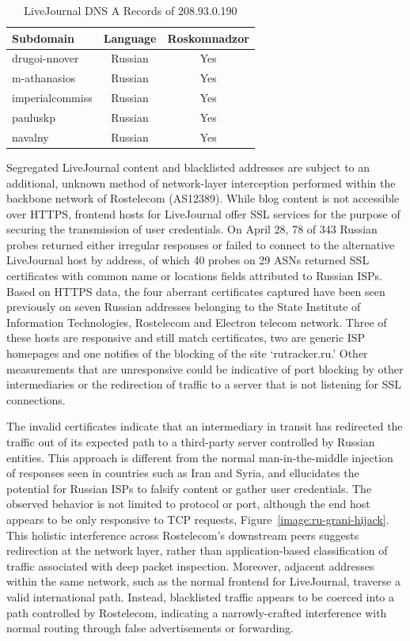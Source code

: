 \begin{table}
    \begin{tabular}{l | c | c}
        \textbf{Subdomain} & \textbf{Language} & \textbf{Roskomnadzor}\\
        \hline
        drugoi-nnover & Russian & Yes\\
        m-athanasios & Russian & Yes\\
        imperialcommiss & Russian & Yes\\
        pauluskp & Russian & Yes \\
        navalny & Russian & Yes \\
        \hline
    \end{tabular}
    \caption{LiveJournal DNS A Records of 208.93.0.190}
    \label{table:lj-blocked-blogs}
\end{table}

Segregated LiveJournal content and blacklisted addresses are subject to an
additional, unknown method of network-layer interception performed within the
backbone network of Rostelecom (AS12389). While blog content is not
accessible over HTTPS, frontend hosts for LiveJournal offer SSL services for the purpose of
securing the transmission of user credentials. On April 28, 78 of 343 Russian
probes returned either irregular responses or failed to connect to the alternative LiveJournal host by address, of which 40
probes on 29 ASNs returned SSL certificates with common name or locations
fields attributed to Russian ISPs. Based on HTTPS data, the four aberrant
certificates captured have been seen previously on seven Russian addresses
belonging to the State Institute of Information Technologies, Rostelecom and
Electron telecom network. Three of these hosts are responsive and still match
certificates, two are generic ISP homepages and one notifies of the blocking of
the site `rutracker.ru.' Other measurements that are unresponsive could be
indicative of port blocking by other intermediaries or the redirection of
traffic to a server that is not listening for SSL connections.

The invalid certificates indicate that an intermediary in transit has
redirected the traffic out of its expected path to a third-party
server controlled by Russian entities. This approach is different from the
normal man-in-the-middle injection of responses seen in countries such as Iran and Syria, and
ellucidates the potential for Russian ISPs to falsify content or gather user
credentials. The observed behavior is not limited to protocol or port, although the end
host appears to be only responsive to TCP requests,
Figure~\ref{image:ru-grani-hijack}. This holistic interference across Rostelecom's downstream peers suggests
redirection at the network layer, rather than application-based classification of traffic associated with deep packet inspection. Moreover,
adjacent addresses within the same network, such as the normal frontend for
LiveJournal, traverse a valid international path. Instead, blacklisted traffic
appears to be coerced into a path controlled by Rostelecom, indicating a narrowly-crafted interference with
normal routing through false advertisements or forwarding.
